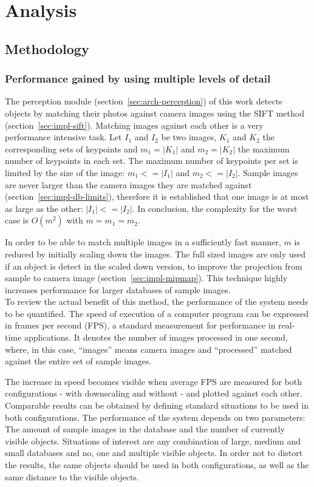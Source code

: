 \chapter{Analysis}
\label{chap:analysis}

\section{Methodology}

\subsection{Performance gained by using multiple levels of detail}
\label{sec:analysis-mipmap}
The perception module (section~\ref{sec:arch-perception}) of this work detects objects by matching their photos against camera images using the SIFT method (section~\ref{sec:impl-sift}). Matching images against each other is a very performance intensive task. Let $I_1$ and $I_2$ be two images, $K_1$ and $K_2$ the corresponding sets of keypoints and $m_1 = |K_1|$ and $m_2 = |K_2|$ the maximum number of keypoints in each set. The maximum number of keypoints per set is limited by the size of the image: $m_1 <= |I_1|$ and $m_2 <= |I_2|$. Sample images are never larger than the camera images they are matched against (section~\ref{sec:impl-db-limits}), therefore it is established that one image is at most as large as the other: $|I_1| <= |I_2|$. In conclusion, the complexity for the worst case is $O(m^2)$ with $m = m_1 = m_2$.

In order to be able to match multiple images in a sufficiently fast manner, $m$ is reduced by initially scaling down the images. The full sized images are only used if an object is detect in the scaled down version, to improve the projection from sample to camera image (section~\ref{sec:impl-mipmap}). This technique highly increases performance for larger databases of sample images. \\

To review the actual benefit of this method, the performance of the system needs to be quantified. The speed of execution of a computer program can be expressed in frames per second (FPS), a standard measurement for performance in real-time applications. It denotes the number of images processed in one second, where, in this case, ``images'' means camera images and ``processed'' matched against the entire set of sample images.

The increase in speed becomes visible when average FPS are measured for both configurations - with downscaling and without - and plotted against each other. Comparable results can be obtained by defining standard situations to be used in both configurations. The performance of the system depends on two parameters: The amount of sample images in the database and the number of currently visible objects. Situations of interest are any combination of large, medium and small databases and no, one and multiple visible objects. In order not to distort the results, the same objects should be used in both configurations, as well as the same distance to the visible objects. \\

